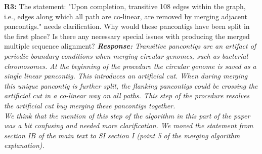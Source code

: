 \documentclass[aps,rmp,onecolumn]{revtex4-1}
\newcommand{\Marco}[1]{{\color{gray}Marco: #1}}
\newcommand{\Liam}[1]{{\color{teal}Liam: #1}}
\newcommand{\reviewer}[2]{\textbf{#1:} #2\vskip 5mm}
\newcommand{\response}[1]{{\it {\color{response}\textbf{Response:} #1}}\vskip 5mm}
\begin{document}
\reviewer{R3}{The statement: "Upon completion, transitive 108 edges within the graph, i.e., edges along which all path are co-linear, are removed by merging adjacent pancontigs." needs clarification. Why would these pancontigs have been split in the first place? Is there any necessary special issues with producing the merged multiple sequence alignment?}
\response{Transitive pancontigs are an artifact of periodic boundary conditions when merging circular genomes, such as bacterial chromosomes. At the beginning of the procedure the circular genome is saved as a single linear pancontig. This introduces an artificial cut. When during merging this unique pancontig is further split, the flanking pancontigs could be crossing the artificial cut in a co-linear way on all paths. This step of the procedure resolves the artificial cut buy merging these pancontigs together.\\
      We think that the mention of this step of the algorithm in this part of the paper was a bit confusing and needed more clarification. We moved the statement from section IB of the main text to SI section I (point 5 of the merging algorithm explanation).}
\end{document}
